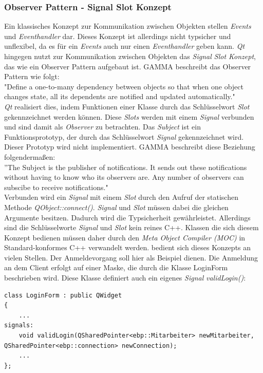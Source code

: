 \subsubsection{Observer Pattern - Signal Slot Konzept}
\label{subsubsec:observer}
Ein klassisches Konzept zur Kommunikation zwischen Objekten stellen \textit{Events} und \textit{Eventhandler} dar. Dieses Konzept ist allerdings nicht typsicher und unflexibel, da es für ein \textit{Events} auch nur einen \textit{Eventhandler} geben kann\cite[S. 32]{Qt4}. \textit{Qt} hingegen nutzt zur Kommunikation zwischen Objekten das \textit{Signal Slot Konzept}, das wie ein Observer Pattern aufgebaut ist. GAMMA beschreibt das Observer Pattern wie folgt: \\
"Define a one-to-many dependency between objects so that when one object changes state, all its dependents are notified and updated automatically\cite[S. 293]{Entwurfsmuster}."\\
\textit{Qt} realisiert dies, indem Funktionen einer Klasse durch das Schlüsselwort \textit{Slot} gekennzeichnet werden können. Diese \textit{Slots} werden mit einem \textit{Signal} verbunden und sind damit als \textit{Observer} zu betrachten. Das \textit{Subject} ist ein Funktionsprototyp, der durch das Schlüsselwort \textit{Signal} gekennzeichnet wird. Dieser Prototyp wird nicht implementiert. GAMMA beschreibt diese Beziehung folgendermaßen:\\
''The Subject is the publisher of notifications. It sends out these notifications without having  to know who its observers are. Any number of observers can subscibe to receive notifications\cite[S. 294]{Entwurfsmuster}."\\
Verbunden wird ein \textit{Signal} mit einem \textit{Slot} durch den Aufruf der statischen Methode \textit{QObject::connect()}. \textit{Signal} und \textit{Slot} müssen dabei die gleichen Argumente besitzen. Dadurch wird die Typsicherheit gewährleistet. Allerdings sind die Schlüsselworte \textit{Signal} und \textit{Slot} kein reines C++. Klassen die sich diesem Konzept bedienen müssen daher durch den \textit{Meta Object Compiler (MOC)} in Standard-konformes C++ verwandelt werden\cite[Vgl. S. 51]{Qt4}.
\EBP bedient sich dieses Konzepts an vielen Stellen. Der Anmeldevorgang soll hier als Beispiel dienen. Die Anmeldung an dem Client erfolgt auf einer Maske, die durch die Klasse LoginForm beschrieben wird. Diese Klasse definiert auch ein eigenes \textit{Signal} \textit{validLogin()}:
\begin{lstlisting}
class LoginForm : public QWidget
{
    ...
signals:
    void validLogin(QSharedPointer<ebp::Mitarbeiter> newMitarbeiter, QSharedPointer<ebp::connection> newConnection);
    ...
};
\end{lstlisting}
